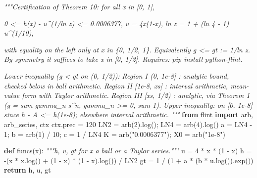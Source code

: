 \documentclass[
  11pt,
]{article}
\newenvironment{Shaded}{}{}
\newcommand{\CommentTok}[1]{\textcolor[rgb]{0.38,0.63,0.69}{\textit{#1}}}
\newcommand{\ControlFlowTok}[1]{\textcolor[rgb]{0.00,0.44,0.13}{\textbf{#1}}}
\newcommand{\DecValTok}[1]{\textcolor[rgb]{0.25,0.63,0.44}{#1}}
\newcommand{\ImportTok}[1]{\textcolor[rgb]{0.00,0.50,0.00}{\textbf{#1}}}
\newcommand{\KeywordTok}[1]{\textcolor[rgb]{0.00,0.44,0.13}{\textbf{#1}}}
\newcommand{\NormalTok}[1]{#1}
\newcommand{\OperatorTok}[1]{\textcolor[rgb]{0.40,0.40,0.40}{#1}}
\newcommand{\StringTok}[1]{\textcolor[rgb]{0.25,0.44,0.63}{#1}}
\begin{document}
\begin{Shaded}
\begin{Highlighting}[]
\CommentTok{"""Certification of Theorem 10: for all x in [0, 1],}

\CommentTok{    0 \textless{}= h(x) {-} u\^{}(1/ln z) \textless{}= 0.0006377,   u = 4x(1{-}x),  ln z = 1 + (ln 4 {-} 1) u\^{}(1/10),}

\CommentTok{with equality on the left only at x in \{0, 1/2, 1\}. Equivalently g \textless{}= gt := 1/ln z.}
\CommentTok{By symmetry it suffices to take x in [0, 1/2]. Requires: pip install python{-}flint.}

\CommentTok{Lower inequality (g \textless{} gt on (0, 1/2)):}
\CommentTok{  Region I   (0, 1e{-}8]  : analytic bound, checked below in ball arithmetic.}
\CommentTok{  Region II  [1e{-}8, xs] : interval arithmetic, mean{-}value form with Taylor arithmetic.}
\CommentTok{  Region III [xs, 1/2)  : analytic, via Theorem 1 (g = sum gamma\_n s\^{}n, gamma\_n \textgreater{}= 0, sum 1).}
\CommentTok{Upper inequality: on [0, 1e{-}8] since h {-} A \textless{}= h(1e{-}8); elsewhere interval arithmetic.}
\CommentTok{"""}
\ImportTok{from}\NormalTok{ flint }\ImportTok{import}\NormalTok{ arb, arb\_series, ctx}
\NormalTok{ctx.prec }\OperatorTok{=} \DecValTok{120}
\NormalTok{LN2 }\OperatorTok{=}\NormalTok{ arb(}\DecValTok{2}\NormalTok{).log()}\OperatorTok{;}\NormalTok{ LN4 }\OperatorTok{=}\NormalTok{ arb(}\DecValTok{4}\NormalTok{).log()}
\NormalTok{a }\OperatorTok{=}\NormalTok{ LN4 }\OperatorTok{{-}} \DecValTok{1}\OperatorTok{;}\NormalTok{ b }\OperatorTok{=}\NormalTok{ arb(}\DecValTok{1}\NormalTok{) }\OperatorTok{/} \DecValTok{10}\OperatorTok{;}\NormalTok{ c }\OperatorTok{=} \DecValTok{1} \OperatorTok{/}\NormalTok{ LN4}
\NormalTok{K }\OperatorTok{=}\NormalTok{ arb(}\StringTok{"0.0006377"}\NormalTok{)}\OperatorTok{;}\NormalTok{ X0 }\OperatorTok{=}\NormalTok{ arb(}\StringTok{"1e{-}8"}\NormalTok{)}

\KeywordTok{def}\NormalTok{ funcs(x):}
    \CommentTok{"""h, u, gt for x a ball or a Taylor series."""}
\NormalTok{    u }\OperatorTok{=} \DecValTok{4} \OperatorTok{*}\NormalTok{ x }\OperatorTok{*}\NormalTok{ (}\DecValTok{1} \OperatorTok{{-}}\NormalTok{ x)}
\NormalTok{    h }\OperatorTok{=} \OperatorTok{{-}}\NormalTok{(x }\OperatorTok{*}\NormalTok{ x.log() }\OperatorTok{+}\NormalTok{ (}\DecValTok{1} \OperatorTok{{-}}\NormalTok{ x) }\OperatorTok{*}\NormalTok{ (}\DecValTok{1} \OperatorTok{{-}}\NormalTok{ x).log()) }\OperatorTok{/}\NormalTok{ LN2}
\NormalTok{    gt }\OperatorTok{=} \DecValTok{1} \OperatorTok{/}\NormalTok{ (}\DecValTok{1} \OperatorTok{+}\NormalTok{ a }\OperatorTok{*}\NormalTok{ (b }\OperatorTok{*}\NormalTok{ u.log()).exp())}
    \ControlFlowTok{return}\NormalTok{ h, u, gt}


\end{Highlighting}
\end{Shaded}
\end{document}

